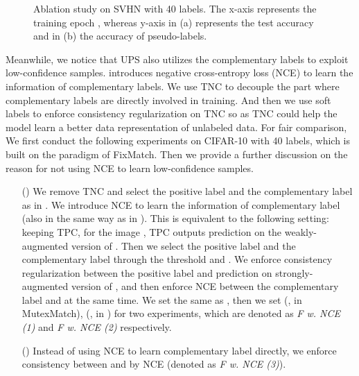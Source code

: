 \documentclass[lettersize,journal]{IEEEtran}
\theoremstyle{plain}
\theoremstyle{definition}
\theoremstyle{remark}
\begin{document}
 \newcommand{\mysize}{5.4cm}
\begin{figure}[t]
\centering
{}
\caption{Ablation study on SVHN with 40 labels. The x-axis represents the training epoch , whereas y-axis in (a) represents the test accuracy and in (b) the accuracy of pseudo-labels.}
  \label{fig2}
  \vskip 0in
\end{figure}
\begin{table}[t]
\centering
\caption{Accuracy (\%) on SVHN with 40 labels and various  under the setting of ().  represents the loss weight of  while  means original FixMatch.}
   \label{tab:r1}
\end{table}
Meanwhile, we notice that UPS \cite{rizve2021in} also utilizes the complementary labels to exploit low-confidence samples. \cite{rizve2021in} introduces negative cross-entropy loss (NCE) to learn the information of complementary labels. We use TNC to decouple the part where complementary labels are directly involved in training. 
And then we use soft labels to enforce consistency regularization on TNC so as TNC could help the model learn a better data representation of unlabeled data. For fair comparison, We first conduct the following experiments on CIFAR-10 with 40 labels, which is built on the paradigm of FixMatch. Then we provide a further discussion on the reason for not using NCE to learn low-confidence samples.
\begin{enumerate}
  \item [(\romannumeral4)] 
  We remove TNC and select the positive label and the complementary label as in \cite{rizve2021in}. We introduce NCE to learn the information of complementary label (also in the same way as in \cite{rizve2021in}). This is equivalent to the following setting: keeping TPC, for the image , TPC outputs prediction  on the weakly-augmented version of . Then we select the positive label and the complementary label through the threshold  and  \cite{rizve2021in}. We enforce consistency regularization between the positive label and prediction  on strongly-augmented version of , and then enforce NCE between the complementary label and  at the same time. We set the same  as \cite{rizve2021in}, then we set  (\ie,  in MutexMatch),  (\ie,  in \cite{rizve2021in}) for two experiments, which are denoted as \textit{F w. NCE (1)} and \textit{F w. NCE (2)} respectively.      
  \item [(\romannumeral5)]
  Instead of using NCE to learn complementary label directly, we enforce consistency  between  and  by NCE (denoted as \textit{F w. NCE (3)}).
\end{enumerate}
\end{document}
